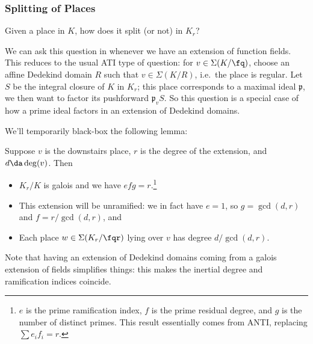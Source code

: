 \hypertarget{splitting-of-places}{%
\subsubsection{Splitting of Places}\label{splitting-of-places}}

\begin{question}

Given a place in \(K\), how does it split (or not) in \(K_r\)?

\end{question}

\begin{remark}

We can ask this question in whenever we have an extension of function
fields. This reduces to the usual ATI type of question: for
\(v\in \Sigma(K/\fq)\), choose an affine Dedekind domain \(R\) such that
\(v\in \Sigma(K/R)\), i.e.~the place is regular. Let \(S\) be the
integral closure of \(K\) in \(K_r\); this place corresponds to a
maximal ideal \(\mathfrak{p}\), we then want to factor its pushforward
\(\mathfrak{p}_v S\). So this question is a special case of how a prime
ideal factors in an extension of Dedekind domains.

\end{remark}

We'll temporarily black-box the following lemma:

\begin{lemma}[?]

Suppose \(v\) is the downstairs place, \(r\) is the degree of the
extension, and \(d\da \deg(v)\). Then

\begin{itemize}
\item
  \(K_r/K\) is galois and we have \(efg = r\).\footnote{\(e\) is the
    prime ramification index, \(f\) is the prime residual degree, and
    \(g\) is the number of distinct primes. This result essentially
    comes from ANTI, replacing \(\sum e_i f_i = r\).}
\item
  This extension will be unramified: we in fact have \(e=1\), so
  \(g = \gcd(d, r)\) and \(f = r/\gcd(d, r)\), and
\item
  Each place \(w\in \Sigma(K_r/\fqr)\) lying over \(v\) has degree
  \(d/\gcd(d, r)\).
\end{itemize}

\end{lemma}

\begin{remark}

Note that having an extension of Dedekind domains coming from a galois
extension of fields simplifies things: this makes the inertial degree
and ramification indices coincide.

\end{remark}

